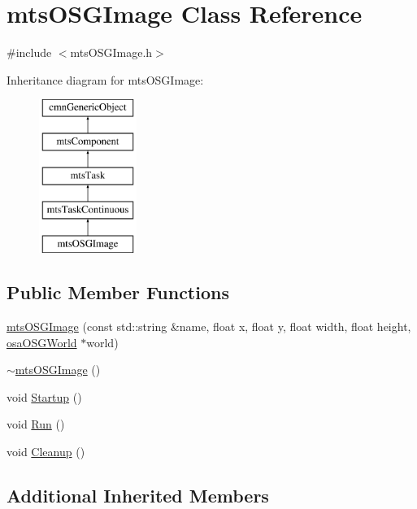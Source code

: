 \hypertarget{classmts_o_s_g_image}{}\section{mts\+O\+S\+G\+Image Class Reference}
\label{classmts_o_s_g_image}


{\ttfamily \#include $<$mts\+O\+S\+G\+Image.\+h$>$}

Inheritance diagram for mts\+O\+S\+G\+Image\+:\begin{figure}[H]
\begin{center}
\leavevmode
\includegraphics[height=5.000000cm]{dc/d74/classmts_o_s_g_image}
\end{center}
\end{figure}
\subsection*{Public Member Functions}
\begin{DoxyCompactItemize}
\item 
\hyperlink{classmts_o_s_g_image_a89c464ab3f3139d21466cd035aa2a167}{mts\+O\+S\+G\+Image} (const std\+::string \&name, float x, float y, float width, float height, \hyperlink{classosa_o_s_g_world}{osa\+O\+S\+G\+World} $\ast$world)
\item 
\hyperlink{classmts_o_s_g_image_afa1ddbaae737c8d49a24f9ae0d7b977f}{$\sim$mts\+O\+S\+G\+Image} ()
\item 
void \hyperlink{classmts_o_s_g_image_a01e9d9b24324cb484ebdcd9740f0274f}{Startup} ()
\item 
void \hyperlink{classmts_o_s_g_image_a9512bb3ca14c4f6de9e64f2c0f7bda7c}{Run} ()
\item 
void \hyperlink{classmts_o_s_g_image_ab9f692410e0d5a58ba150d237f8f1b18}{Cleanup} ()
\end{DoxyCompactItemize}
\subsection*{Additional Inherited Members}


